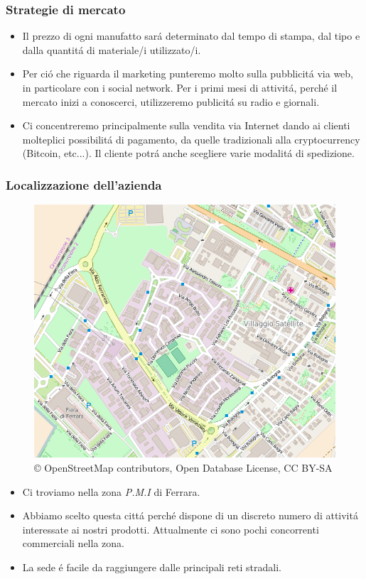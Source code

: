 \documentclass{beamer}
\begin{document}
    \begin{frame}
        \frametitle{Strategie di mercato}
        \begin{itemize}
                \item Il prezzo di ogni manufatto sar\'a determinato dal tempo 
di stampa, dal tipo e dalla quantit\'a di materiale/i utilizzato/i.
                \item Per ci\'o che riguarda il marketing punteremo molto sulla 
pubblicit\'a via web, in particolare con i social network. 
Per i primi mesi di attivit\'a, perch\'e il mercato inizi a conoscerci, 
utilizzeremo publicit\'a su radio e giornali.
                \item Ci concentreremo principalmente sulla vendita via 
Internet dando ai clienti molteplici possibilit\'a di pagamento, da quelle 
tradizionali alla cryptocurrency (Bitcoin, etc...). Il cliente potr\'a anche 
scegliere varie modalit\'a di spedizione.
        \end{itemize}
    \end{frame}

    \begin{frame}
        \frametitle{Localizzazione dell'azienda}
            \begin{figure}[H]
               \includegraphics[scale=0.15]{map.png}
                \caption{\copyright{} OpenStreetMap contributors, Open 
Database License, CC BY-SA}
            \end{figure}
            \begin{itemize}
                \item Ci troviamo nella zona \emph{P.M.I} di Ferrara.
                \item Abbiamo scelto questa citt\'a perch\'e dispone di 
un discreto numero di attivit\'a interessate ai nostri prodotti. Attualmente 
ci sono pochi concorrenti commerciali nella zona.
                \item La sede \'e facile da raggiungere dalle principali reti 
stradali.
            \end{itemize}
    \end{frame}
\end{document}

